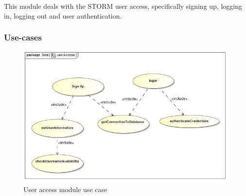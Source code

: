 This module deals with the STORM user access, specifically signing up, logging in, logging out and user authentication.

\subsubsection{Use-cases}
\begin{figure}[H]
    \centering
\includegraphics[width=15cm]{./graphics/userAccessUseCase.jpg}
    \caption{ User access module use case}
\end{figure}

